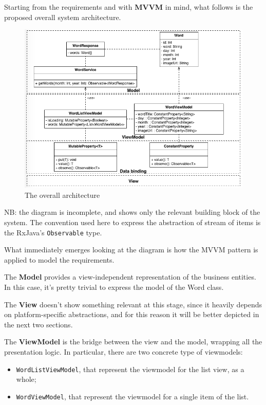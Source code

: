 Starting from the requirements and with \textbf{MVVM} in mind, what
follows is the proposed overall system architecture.

\begin{figure}[htbp]
\centering
\includegraphics[scale=0.5]{imgs/common_arch.png}
\caption{The overall architecture}
\end{figure}

NB: the diagram is incomplete, and shows only the relevant building
block of the system. The convention used here to express the abstraction
of stream of items is the RxJava's \texttt{Observable} type.

What immediately emerges looking at the diagram is how the MVVM pattern
is applied to model the requirements.

The \textbf{Model} provides a view-independent representation of the
business entities. In this case, it's pretty trivial to express the
model of the Word class.

The \textbf{View} doesn't show something relevant at this stage, since
it heavily depends on platform-specific abstractions, and for this
reason it will be better depicted in the next two sections.

The \textbf{ViewModel} is the bridge between the view and the model,
wrapping all the presentation logic. In particular, there are two
concrete type of viewmodels:

\begin{itemize}
\itemsep1pt\parskip0pt
\item
  \texttt{WordListViewModel}, that represent the viewmodel for the list
  view, as a whole;
\item
  \texttt{WordViewModel}, that represent the viewmodel for a single item
  of the list.
\end{itemize}

